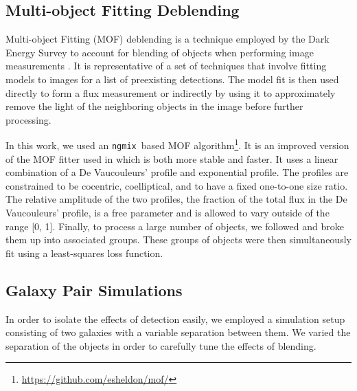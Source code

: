 \documentclass[iop, twocolappendix, appendixfloats, numberedappendix, apj]{hackemulateapj}
\newcommand{\ngmix}{\texttt{ngmix}}
\begin{document}
\subsection{Multi-object Fitting Deblending}

Multi-object Fitting (MOF) deblending is a technique employed by the Dark
Energy Survey to account for blending of objects when performing image
measurements \citep{DESY1cat}. It is representative of a set of techniques that
involve fitting models to images for a list of preexisting detections. The
model fit is then used directly to form a flux measurement or indirectly by
using it to approximately remove the light of the neighboring objects in the
image before further processing.

In this work, we used an \ngmix\ based MOF
algorithm\footnote{\url{https://github.com/esheldon/mof/}}. It is an improved
version of the MOF fitter used in \cite{DESY1cat} which is
both more stable and faster. It uses a linear combination of a De Vaucouleurs'
\citep{devauc1948} profile and exponential profile. The profiles are
constrained to be cocentric, coelliptical, and to have a fixed one-to-one size
ratio.  The relative amplitude of the two profiles, the fraction of the total
flux in the De Vaucouleurs' profile, is a free parameter and is allowed to vary
outside of the range [0, 1]. Finally, to process a large number of objects, we
followed \citet{DESY1cat} and broke them up into associated groups.  These
groups of objects were then simultaneously fit using a least-squares loss
function.

\subsection{Galaxy Pair Simulations}
\label{sec:sims:pairs}

In order to isolate the effects of detection easily, we employed a simulation
setup consisting of two galaxies with a variable separation between them.  We
varied the separation of the objects in order to carefully tune the effects of
blending.
\end{document}
